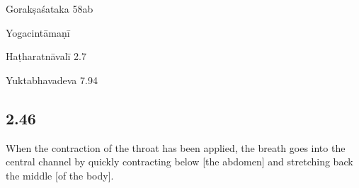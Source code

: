\begin{ekdosis}
\begin{sources}[hp02_045]
\begin{versinnote}
\end{versinnote}
Gorakṣaśataka 58ab

\begin{versinnote}
\end{versinnote}
\end{sources}

\begin{testimonia}[hp02_045]
Yogacintāmaṇī

\begin{versinnote}
\end{versinnote}

Haṭharatnāvalī 2.7

\begin{versinnote}
\end{versinnote}

Yuktabhavadeva 7.94

\begin{versinnote}
\end{versinnote}
\end{testimonia}

\begin{philcomm}[hp02_045]
\end{philcomm}

\subsection*{2.46}
\begin{translation}[hp02_046]
When the contraction of the throat has been applied, the breath goes into the central channel by quickly contracting below [the abdomen] and stretching back the middle [of the body].
\end{translation}


\end{ekdosis}
